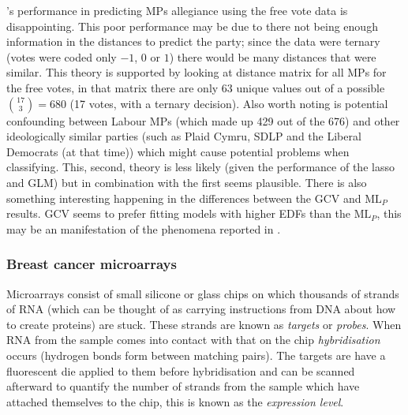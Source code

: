 \mdsds's performance in predicting MPs allegiance using the free vote data is disappointing. This poor performance may be due to there not being enough information in the distances to predict the party; since the data were ternary (votes were coded only $-1$, $0$ or $1$) there would be many distances that were similar. This theory is supported by looking at distance matrix for all MPs for the free votes, in that matrix there are only 63 unique values out of a possible $\binom{17}{3}=680$ (17 votes, with a ternary decision). Also worth noting is potential confounding between Labour MPs (which made up 429 out of the 676) and other ideologically similar parties (such as Plaid Cymru, SDLP and the Liberal Democrats (at that time)) which might cause potential problems when classifying. This, second, theory is less likely (given the performance of the lasso and GLM) but in combination with the first seems plausible. There is also something interesting happening in the differences between the GCV and $\text{ML}_P$ results.  GCV seems to prefer fitting models with higher EDFs than the $\text{ML}_P$, this may be an manifestation of the phenomena reported in .

\subsubsection{Breast cancer microarrays}

Microarrays consist of small silicone or glass chips on which thousands of strands of RNA (which can be thought of as carrying instructions from DNA about how to create proteins) are stuck. These strands are known as \textit{targets} or \textit{probes}. When RNA from the sample comes into contact with that on the chip \textit{hybridisation} occurs (hydrogen bonds form between matching pairs). The targets are have a fluorescent die applied to them before hybridisation and can be scanned afterward to quantify the number of strands from the sample which have attached themselves to the chip, this is known as the \textit{expression level}.

